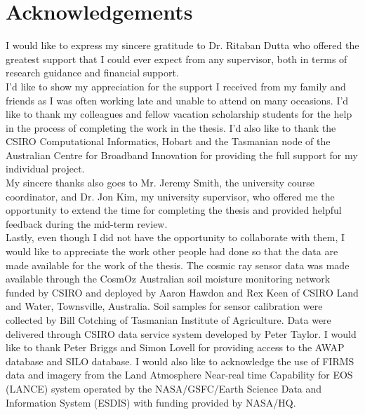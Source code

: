 


\begingroup

\let\clearpage\relax
\let\cleardoublepage\relax
\let\cleardoublepage\relax

\chapter*{Acknowledgements} %

I would like to express my sincere gratitude to  Dr. Ritaban Dutta who offered the greatest support that I could ever expect from any supervisor, both in terms of research guidance and financial support. \\
\newline
I'd like to show my appreciation for the support I received from my family and friends as I was often working late and unable to attend on many occasions. 
I'd like to thank my colleagues and fellow vacation scholarship students for the help in the process of completing the work in the thesis. I'd also like to thank the CSIRO Computational Informatics, Hobart and the Tasmanian node of the Australian Centre for Broadband Innovation for providing the full support for my individual project.\\
\newline
My sincere thanks also goes to Mr. Jeremy Smith, the university course coordinator, and Dr. Jon Kim, my university supervisor, who offered me the opportunity to extend the time for completing the thesis and provided helpful feedback during the mid-term review.\\
\newline
Lastly, even though I did not have the opportunity to collaborate with them, I would like to appreciate the work other people had done so that the data are made available for the work of the thesis. The cosmic ray sensor data was made available through the CosmOz Australian soil moisture monitoring network funded by CSIRO and deployed by Aaron Hawdon and Rex Keen of CSIRO Land and Water, Townsville, Australia. Soil samples for sensor calibration were collected by Bill Cotching of Tasmanian Institute of Agriculture. Data were delivered
through CSIRO data service system developed by Peter Taylor. I would like to thank Peter Briggs and Simon Lovell for providing access to the AWAP database and SILO database. I would also like to acknowledge the
use of FIRMS data and imagery from the Land Atmosphere Near-real time Capability for EOS (LANCE) system operated by the NASA/GSFC/Earth Science Data and Information System (ESDIS) with funding provided by
NASA/HQ.
\endgroup